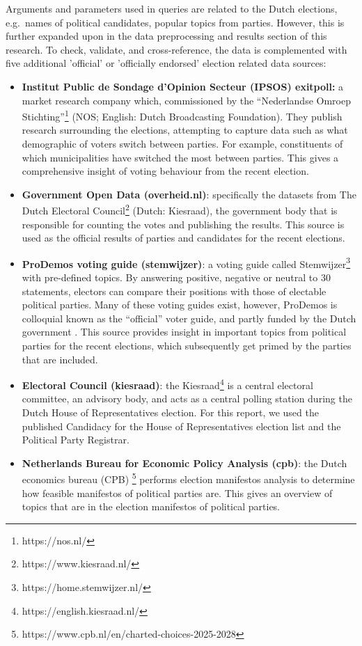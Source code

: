 Arguments and parameters used in queries are related to the Dutch elections, e.g.\ names of political candidates, popular topics from parties.
However, this is further expanded upon in the data preprocessing and results section of this research.
To check, validate, and cross-reference, the data is complemented with five additional 'official' or 'officially endorsed' election related data sources: 
\begin{itemize}
  \item \textbf{Institut Public de Sondage d'Opinion Secteur (IPSOS) exitpoll:} a market research company which, commissioned by the “Nederlandse Omroep Stichting”\footnote{https://nos.nl/} (NOS; English: Dutch Broadcasting Foundation).
  They publish research surrounding the elections, attempting to capture data such as what demographic of voters switch between parties.
  For example, constituents of which municipalities have switched the most between parties\cite{nos}. 
  This gives a comprehensive insight of voting behaviour from the recent election.
  \item \textbf{Government Open Data (overheid.nl)}: specifically the datasets from The Dutch Electoral Council\footnote{https://www.kiesraad.nl/} (Dutch: Kiesraad), the government body that is responsible for counting the votes and publishing the results\cite{kiesraad}.
  This source is used as the official results of parties and candidates for the recent elections.
  \item \textbf{ProDemos voting guide (stemwijzer)}: a voting guide called Stemwijzer\footnote{https://home.stemwijzer.nl/} with pre-defined topics.
  By answering positive, negative or neutral to 30 statements, electors can compare their positions with those of electable political parties.
  Many of these voting guides exist, however, ProDemos is colloquial known as the “official” voter guide, and partly funded by the Dutch government \cite{prodemos}. 
  This source provides insight in important topics from political parties for the recent elections, which subsequently get primed by the parties that are included.
  \item \textbf{Electoral Council (kiesraad)}: the Kiesraad\footnote{https://english.kiesraad.nl/} is a central electoral committee, an advisory body, and acts as a central polling station during the Dutch House of Representatives election.
  For this report, we used the published Candidacy for the House of Representatives election list and the Political Party Registrar.
  \item \textbf{Netherlands Bureau for Economic Policy Analysis (cpb)}: the Dutch economics bureau (CPB) \footnote{https://www.cpb.nl/en/charted-choices-2025-2028} performs election manifestos analysis to determine how feasible manifestos of political parties are.
  This gives an overview of topics that are in the election manifestos of political parties.
\end{itemize}


